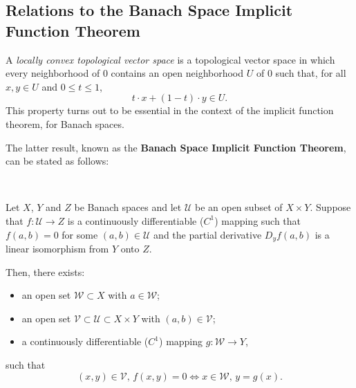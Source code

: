 \noindent
\subsection{Relations to the Banach Space Implicit Function Theorem}
A \textit{locally convex topological vector space} is a topological vector space in which every neighborhood of \(0\) contains an open neighborhood \(U\) of \(0\) such that, for all \(x, y \in U\) and \(0 \leq t \leq 1\),
\[
t\cdot x + (1-t)\cdot y \in U.
\]
This property turns out to be essential in the context of the implicit function theorem, for Banach spaces.

\vspace{0.5cm}

\noindent
The latter result, known as the \textbf{Banach Space Implicit Function Theorem}, can be stated as follows:

\, 

Let \(X\), \(Y\) and \(Z\) be Banach spaces and let \(\mathcal{U}\) be an open subset of \(X \times Y\). Suppose that \(f : \mathcal{U} \to Z\) is a continuously differentiable (\(C^1\)) mapping such that \(f(a, b) = 0\) for some \((a, b) \in \mathcal{U}\) and the partial derivative \(D_y f(a, b)\) is a linear isomorphism from \(Y\) onto \(Z\).

Then, there exists:

\begin{itemize}
    \item an open set \(\mathcal{W} \subset X\) with \(a \in \mathcal{W}\);
    \item an open set \(\mathcal{V} \subset \mathcal{U} \subset X \times Y\) with \((a, b) \in \mathcal{V}\);
    \item a continuously differentiable (\(C^1\)) mapping \(g : \mathcal{W} \to Y\),
\end{itemize}

such that
\[
(x, y) \in \mathcal{V},\, f(x, y) = 0 \iff x \in \mathcal{W},\, y = g(x).
\]







